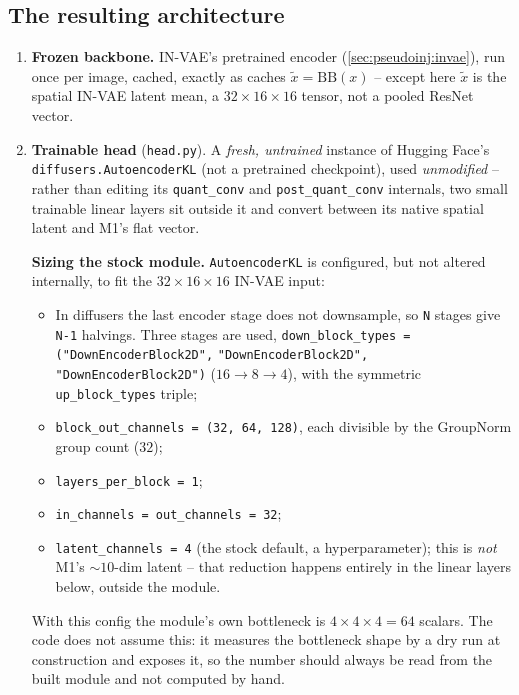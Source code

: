 \subsection{The resulting architecture}
\label{sec:pseudoinj:arch}
\begin{enumerate}[label=(\arabic*),leftmargin=2em]
\item \textbf{Frozen backbone.} IN-VAE's pretrained encoder (\cref{sec:pseudoinj:invae}), run once 
       per image, cached, exactly as  caches $\tilde x=\mathrm{BB}(x)$ -- except 
       here $\tilde x$ is the spatial IN-VAE latent mean, a $32\times16\times16$ tensor, not a pooled 
       ResNet vector.
\item \textbf{Trainable head} (\texttt{head.py}). A \emph{fresh, untrained} instance of Hugging 
      Face's \linebreak
      \texttt{diffusers.AutoencoderKL} \cite{aekl} (not a pretrained checkpoint), 
      used \emph{unmodified} -- rather 
      than editing its \texttt{quant\_conv} and \texttt{post\_quant\_conv} internals, two small 
      trainable linear layers sit outside it and convert between its native spatial latent 
      and M1's flat vector.

      \textbf{Sizing the stock module.} \texttt{AutoencoderKL} \cite{aekl} is configured, but not 
      altered internally, to fit the $32\times16\times16$ IN-VAE input:
      \begin{itemize}[leftmargin=1.3em]
      \item In diffusers the last encoder stage does not downsample, so \texttt{N} stages give 
            \texttt{N-1} halvings. Three stages are used,
            \texttt{down\_block\_types = ("DownEncoderBlock2D",} \texttt{"DownEncoderBlock2D",}
            \texttt{"DownEncoderBlock2D")}
            ($16\to8\to4$), with the symmetric \texttt{up\_block\_types} triple;
      \item \texttt{block\_out\_channels = (32, 64, 128)}, each divisible by the GroupNorm group
            count ($32$);
      \item \texttt{layers\_per\_block = 1};
      \item \texttt{in\_channels = out\_channels = 32};
      \item \texttt{latent\_channels = 4} (the stock default, a hyperparameter); this is \emph{not}
            M1's $\sim\!10$-dim latent -- that reduction happens entirely in the linear layers below,
            outside the module.
      \end{itemize}
      With this config the module's own bottleneck is $4\times4\times4=64$ scalars. The code does not
      assume this: it measures the bottleneck shape by a dry run at construction and exposes it, so
      the number should always be read from the built module and not computed by hand.


\end{enumerate}
